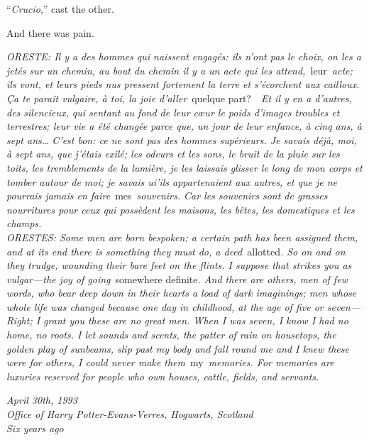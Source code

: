 ``\emph{Crucio},'' cast the other.

And there was pain.

\mybreak

\emph{ORESTE: Il y a des hommes qui naissent engagés: ils n'ont pas le
choix, on les a jetés sur un chemin, au bout du chemin il y a un acte
qui les attend,}~leur~\emph{acte; ils vont, et leurs pieds nus pressent
fortement la terre et s'écorchent aux cailloux. Ça te paraît vulgaire, à
toi, la joie d'aller}~quelque part?~~\emph{Et il y en a d'autres, des
silencieux, qui sentant au fond de leur cœur le poids d'images troubles
et terrestres; leur vie a été changée parce que, un jour de leur
enfance, à cinq ans, à sept ans\ldots{} C'est bon: ce ne sont pas des
hommes supérieurs. Je savais déjà, moi, à sept ans, que j'étais exilé;
les odeurs et les sons, le bruit de la pluie sur les toits, les
tremblements de la lumière, je les laissais glisser le long de mon corps
et tomber autour de moi; je savais ui'ils appartenaient aux autres, et
que je ne pourrais jamais en faire}~mes~\emph{souvenirs. Car les
souvenirs sont de grasses nourritures pour ceux qui possèdent les
maisons, les bêtes, les domestiques et les champs.}\\

\emph{ORESTES: Some men are born bespoken; a certain path has been
assigned them, and at its end there is something they must do, a
deed}~allotted\emph{. So on and on they trudge, wounding their bare feet
on the flints. I suppose that strikes you as vulgar---the joy of
going}~somewhere definite\emph{. And there are others, men of few words,
who bear deep down in their hearts a load of dark imaginings; men whose
whole life was changed because one day in childhood, at the age of five
or seven--- Right; I grant you these are no great men. When I was seven,
I know I had no home, no roots. I let sounds and scents, the patter of
rain on housetops, the golden play of sunbeams, slip past my body and
fall round me and I knew these were for others, I could never make
them}~my~\emph{memories. For memories are luxuries reserved for people
who own houses, cattle, fields, and servants.}


\mybreak

\emph{April 30th, 1993}\\
\emph{Office of Harry Potter-Evans-Verres, Hogwarts, Scotland}\\
\emph{Six years ago}\\


